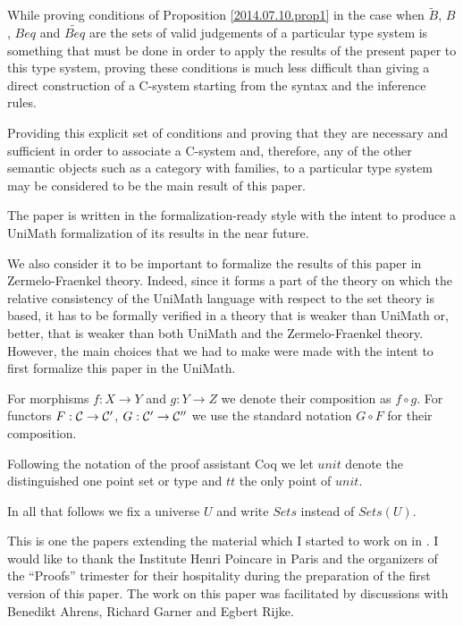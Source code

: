 \documentclass[11pt]{article}
\newcommand{\sr}{\rightarrow}
\newcommand{\wt}{\widetilde}
\begin{document}
While proving conditions of Proposition \ref{2014.07.10.prop1} in the case when ${\wt{B}}$, ${B}$, ${Beq}$ and ${\wt{Beq}}$ are the sets of valid judgements of a particular type system is something that must be done in order to apply the results of the present paper to this type system, proving these conditions is much less difficult than giving a direct construction of a C-system starting from the syntax and the inference rules.

Providing this explicit set of conditions and proving that they are necessary and sufficient in order to associate a C-system and, therefore, any of the other semantic objects such as a category with families, to a particular type system may be considered to be the main result of this paper. 

\vspace{5mm}

The paper is written in the formalization-ready style with the intent to produce a UniMath formalization of its results in the near future. 

We also consider it to be important to formalize the results of this paper in Zermelo-Fraenkel theory. Indeed, since it forms a part of the theory on which the relative consistency of the UniMath language with respect to the set theory is based, it has to be formally verified in a theory that is weaker than UniMath or, better, that is weaker than both UniMath and the Zermelo-Fraenkel theory. However, the main choices that we had to make were made with the intent to first formalize this paper in the UniMath.

\vspace{5mm}

For morphisms $f:X\sr Y$ and $g:Y\sr Z$ we denote their composition as $f\circ g$. For functors $F:{\cal C}\sr {\cal C}'$, $G:{\cal C}'\sr {\cal C}''$ we use the standard notation $G\circ F$ for their composition. 

Following the notation of the proof assistant Coq we let $unit$ denote the distinguished one point set or type and $tt$ the only point of $unit$. 

In all that follows we fix a universe $U$ and write $Sets$ instead of $Sets(U)$.  

This is one the papers extending the material which I started to work on in \cite{NTS}. I would like to thank the Institute Henri Poincare in Paris and the organizers of the ``Proofs'' trimester for their hospitality during the preparation of the first version of this paper. The work on this paper was facilitated by discussions with Benedikt Ahrens, Richard Garner and Egbert Rijke.  
\end{document}
